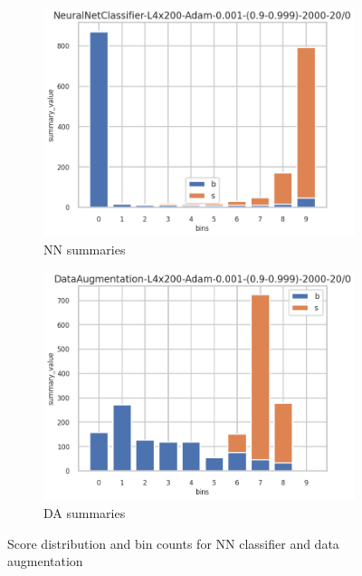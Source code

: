 \begin{figure}[ht!]
  \begin{subfigure}[t]{0.49\linewidth}
    \includegraphics[width=\linewidth]{GG-prior/NeuralNetClassifier/valid_summaries.png}
    \caption{NN summaries}
  \end{subfigure}%
  \hfill
  \begin{subfigure}[t]{0.49\linewidth}
    \includegraphics[width=\linewidth]{GG-prior/DataAugmentation/valid_summaries.png}
    \caption{DA summaries}
  \end{subfigure}

  \caption{Score distribution and bin counts for NN classifier and data augmentation}
  \label{fig:gg_prior_distrib_summaries}
\end{figure}



